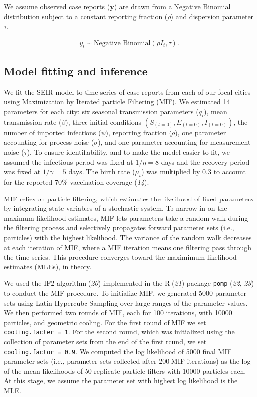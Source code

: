\documentclass[3p]{elsarticle} %
\begin{document}
We assume observed case reports (\(\textbf{y}\)) are drawn from a
Negative Binomial distribution subject to a constant reporting fraction
(\(\rho\)) and dispersion parameter \(\tau\),

\begin{align}
y_t \sim \text{Negative Binomial} \left( \rho I_t, \tau \right).
\end{align}

\hypertarget{model-fitting-and-inference}{%
\subsection{Model fitting and
inference}\label{model-fitting-and-inference}}

We fit the SEIR model to time series of case reports from each of our
focal cities using Maximization by Iterated particle Filtering (MIF). We
estimated 14 parameters for each city: six seasonal transmission
parameters (\(q_i\)), mean transmission rate (\(\beta\)), three initial
conditions \(\left(S_{(t=0)},E_{(t=0)},I_{(t=0)}\right)\), the number of
imported infections (\(\psi\)), reporting fraction (\(\rho\)), one
parameter accounting for process noise (\(\sigma\)), and one parameter
accounting for measurement noise (\(\tau\)). To ensure identifiability,
and to make the model easier to fit, we assumed the infectious period
was fixed at \(1/\eta = 8\) days and the recovery period was fixed at
\(1/\gamma = 5\) days. The birth rate (\(\mu_t\)) was multiplied by 0.3
to account for the reported 70\% vaccination coverage (\emph{14}).

MIF relies on particle filtering, which estimates the likelihood of
fixed parameters by integrating state variables of a stochastic system.
To narrow in on the maximum likelihood estimates, MIF lets parameters
take a random walk during the filtering process and selectively
propagates forward parameter sets (i.e., particles) with the highest
likelihood. The variance of the random walk decreases at each iteration
of MIF, where a MIF iteration means one filtering pass through the time
series. This procedure converges toward the maximimum likelihood
estimates (MLEs), in theory.

We used the IF2 algorithm (\emph{20}) implemented in the R (\emph{21})
package \texttt{pomp} (\emph{22}, \emph{23}) to conduct the MIF
procedure. To initialize MIF, we generated 5000 parameter sets using
Latin Hypercube Sampling over large ranges of the parameter values. We
then performed two rounds of MIF, each for 100 iterations, with 10000
particles, and geometric cooling. For the first round of MIF we set
\texttt{cooling.facter\ =\ 1}. For the second round, which was
initialized using the collection of parameter sets from the end of the
first round, we set \texttt{cooling.factor\ =\ 0.9}. We computed the log
likelihood of 5000 final MIF parameter sets (i.e., parameter sets
collected after 200 MIF iterations) as the log of the mean likelihoods
of 50 replicate particle filters with 10000 particles each. At this
stage, we assume the parameter set with highest log likelihood is the
MLE.
\end{document}
